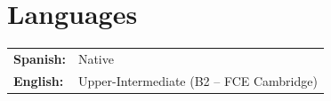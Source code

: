 \documentclass[a4paper,10pt]{article}
\begin{document}
\section{Languages}

\begin{tabular}{@{}l l}
  \textbf{Spanish:} & Native \\[3pt]
  \textbf{English:} & Upper-Intermediate (B2 -- FCE Cambridge) \\
\end{tabular}
\end{document}
